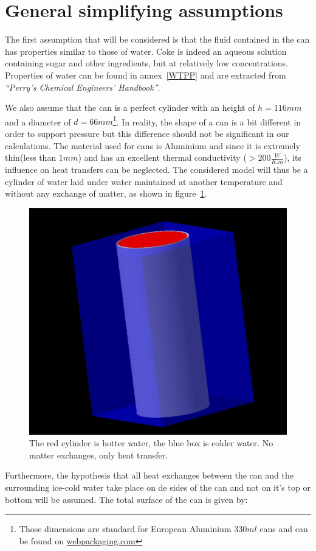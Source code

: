 \documentclass{report}
\begin{document}
	\section{General simplifying assumptions}\label{gsa}
	
	The first assumption that will be considered is that the fluid contained in the can has properties similar to those of water. Coke is indeed an aqueous solution containing sugar and other ingredients, but at relatively low concentrations.
	Properties of water can be found in annex~\ref{WTPP} and are extracted from \emph{``Perry’s Chemical Engineers’ Handbook''\cite{properties}}.
	
	We also assume that the can is a perfect cylinder with an height of $h=116mm$ and a diameter of $d=66mm$\footnote{Those dimensions are standard for European Aluminium $330ml$ cans and can be found on \hyperref{http://www.webpackaging.com/en/portals/rexam/assets/11059498/spec-alu-202/}{}{}{webpackaging.com}}. In reality, the shape of a can is a bit different in order to support pressure but this difference should not be significant in our calculations. The material used for cans is Aluminium and since it is extremely thin(less than $1mm$) and has an excellent thermal conductivity ($>200\frac{W}{K.m}$), its influence on heat transfers can be neglected. The considered model will thus be a cylinder of water laid under water maintained at another temperature and without any exchange of matter, as shown in figure~\ref{cyl}.
	
	\begin{figure}
		\centering
		\includegraphics[width=.5\textwidth]{img/cyl.jpg}
		\caption{The red cylinder is hotter water, the blue box is colder water. No matter exchanges, only heat transfer.}
		\label{cyl}
	\end{figure}
	
	Furthermore, the hypothesis that all heat exchanges between the can and the surrounding ice-cold water take place on de sides of the can and not on it's top or bottom will be assumed. The total surface of the can is given by:
	
\end{document}
